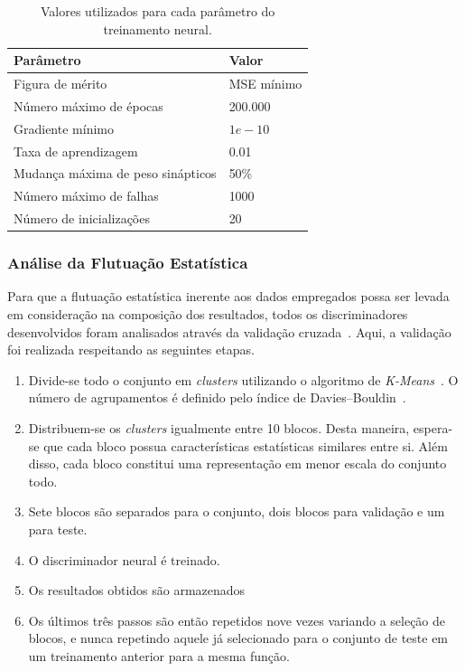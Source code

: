 \begin{table}[htbp!]\footnotesize
  \centering
  \tabcolsep=0.08cm
  \begin{tabular}{ m{7cm} m{3cm} }
      Parâmetro & Valor \\
      \midrule
      Figura de mérito           & MSE mínimo \\
      Número máximo de épocas    & 200.000 \\
      Gradiente mínimo           & $1e-10$ \\
      Taxa de aprendizagem       & 0.01 \\
      Mudança máxima de peso sinápticos    & 50\% \\
      Número máximo de falhas    & 1000 \\
      Número de inicializações   & 20 \\
      \bottomrule
  \end{tabular}
  \caption{Valores utilizados para cada parâmetro do treinamento neural.}
  \label{table:nnparameters}

\end{table}

\subsubsection{Análise da Flutuação Estatística}

Para que a flutuação estatística inerente aos dados empregados possa ser levada
em consideração na composição dos resultados, todos os discriminadores
desenvolvidos foram analisados através da validação cruzada~\cite{HAYKIN2008}.
Aqui, a validação foi realizada respeitando as seguintes etapas.

\begin{enumerate}
    \item Divide-se todo o conjunto em \emph{clusters} utilizando o algoritmo de
    \emph{K-Means}~\cite{HARTIGAN1979}. O número de agrupamentos é definido pelo
    índice de Davies--Bouldin~\cite{DAVIES1979}.
    \item Distribuem-se os \emph{clusters} igualmente entre 10 blocos. Desta
    maneira, espera-se que cada bloco possua características estatísticas
    similares entre si. Além disso, cada bloco constitui uma representação em
    menor escala do conjunto todo.
    \item Sete blocos são separados para o conjunto, dois blocos para validação
    e um para teste.
    \item O discriminador neural é treinado.
    \item Os resultados obtidos são armazenados
    \item Os últimos três passos são então repetidos nove vezes variando a
    seleção de blocos, e nunca repetindo aquele já selecionado para o conjunto
    de teste em um treinamento anterior para a mesma função.
\end{enumerate}


